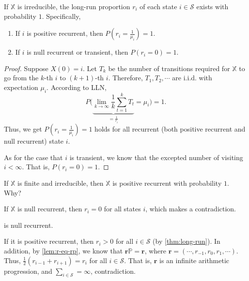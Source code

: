 \begin{theorem} \label{thm:long-run}
If $ \mathbb{X} $ is irreducible, the long-run proportion $ r_{i} $ of each state $ i \in \mathcal{S} $ exists with probability $ 1 $. Specifically,
\begin{enumerate}
  \item If $ i $ is positive recurrent, then $ P \left( r_{i} = \frac{1}{\mu_{i}} \right) = 1 $.
  \item If $ i $ is null recurrent or transient, then $ P(r_{i} = 0) = 1 $.
\end{enumerate}

\begin{proof}
Suppose $ X(0) = i $. Let $ T_{k} $ be the number of transitions required for $ \mathbb{X} $ to go from the $ k $-th $ i $ to $ (k + 1) $-th $ i $. Therefore, $ T_{1}, T_{2}, \cdots $ are i.i.d. with expectation $ \mu_{i} $. According to LLN,
\[ P \Bigg( \underbrace{\lim_{k \to \infty} \frac{1}{k} \sum_{t = 1}^{k} T_{t}}_{= \frac{1}{r_{i}}} = \mu_{i} \Bigg) = 1. \]
Thus, we get $ P \left( r_{i} = \frac{1}{\mu_{i}} \right) = 1 $ holds for all recurrent (both positive recurrent and null recurrent) state $ i $.

As for the case that $ i $ is transient, we know that the excepted number of visiting $ i < \infty $. That is, $ P(r_{i} = 0) = 1 $.
\end{proof}
\end{theorem}

\begin{example}
If $ \mathbb{X} $ is finite and irreducible, then $ \mathbb{X} $ is positive recurrent with probability $ 1 $. Why?

If $ \mathbb{X} $ is null recurrent, then $ r_{i} = 0 $ for all states $ i $, which makes a contradiction.
\end{example}

\begin{example}
 is null recurrent.

If it is positive recurrent, then $ r_{i} > 0 $ for all $ i \in \mathcal{S} $ (by \autoref{thm:long-run}).
In addition, by \autoref{lem:r-eq-rp}, we know that $ \mathbf{r}\mathbb{P} = \mathbf{r} $, where $ \mathbf{r} = (\cdots, r_{-1}, r_{0}, r_{1}, \cdots) $. Thus, $ \frac{1}{2} (r_{i - 1} + r_{i + 1}) = r_{i} $ for all $ i \in \mathcal{S} $. That is, $ \mathbf{r} $ is an infinite arithmetic progression, and $ \sum_{i \in \mathcal{S}} = \infty $, contradiction.
\end{example}


